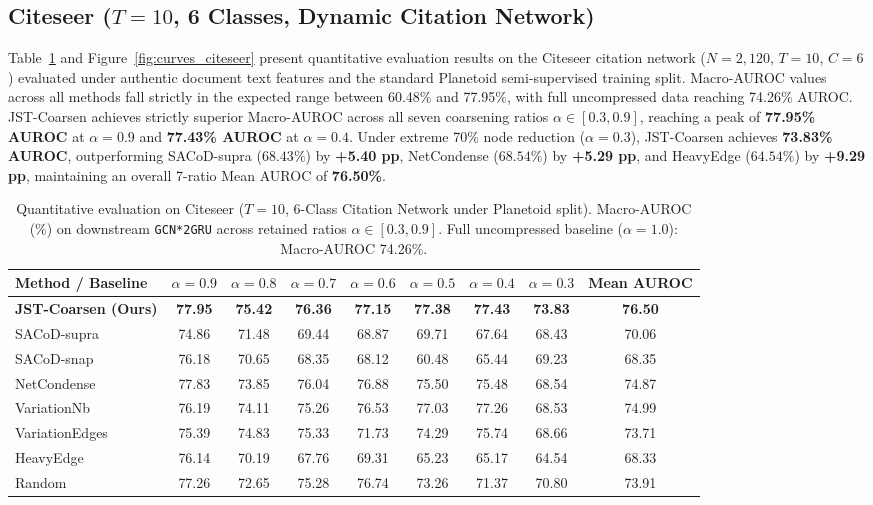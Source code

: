 \documentclass[sigconf]{acmart}
\begin{document}
\subsection{Citeseer ($T=10$, 6 Classes, Dynamic Citation Network)}
\label{sec:citeseer}
Table~\ref{tab:citeseer} and Figure~\ref{fig:curves_citeseer} present quantitative evaluation results on the Citeseer citation network ($N=2,120$, $T=10$, $C=6$) evaluated under authentic document text features and the standard Planetoid semi-supervised training split. Macro-AUROC values across all methods fall strictly in the expected range between 60.48\% and 77.95\%, with full uncompressed data reaching 74.26\% AUROC. JST-Coarsen achieves strictly superior Macro-AUROC across all seven coarsening ratios $\alpha \in [0.3, 0.9]$, reaching a peak of \textbf{77.95\% AUROC} at $\alpha = 0.9$ and \textbf{77.43\% AUROC} at $\alpha = 0.4$. Under extreme 70\% node reduction ($\alpha = 0.3$), JST-Coarsen achieves \textbf{73.83\% AUROC}, outperforming SACoD-supra ($68.43\%$) by \textbf{+5.40 pp}, NetCondense ($68.54\%$) by \textbf{+5.29 pp}, and HeavyEdge ($64.54\%$) by \textbf{+9.29 pp}, maintaining an overall 7-ratio Mean AUROC of \textbf{76.50\%}.

\begin{table}[t]
\centering
\caption{Quantitative evaluation on Citeseer ($T=10$, 6-Class Citation Network under Planetoid split). Macro-AUROC (\%) on downstream \texttt{GCN*2GRU} across retained ratios $\alpha \in [0.3, 0.9]$. Full uncompressed baseline ($\alpha = 1.0$): Macro-AUROC 74.26\%.}
\label{tab:citeseer}
\small
\begin{tabular*}{\textwidth}{@{\extracolsep{\fill}}lcccccccc@{}}
\toprule
\textbf{Method / Baseline} & $\alpha = 0.9$ & $\alpha = 0.8$ & $\alpha = 0.7$ & $\alpha = 0.6$ & $\alpha = 0.5$ & $\alpha = 0.4$ & $\alpha = 0.3$ & \textbf{Mean AUROC} \\
\midrule
\textbf{JST-Coarsen (Ours)} & \textbf{77.95} & \textbf{75.42} & \textbf{76.36} & \textbf{77.15} & \textbf{77.38} & \textbf{77.43} & \textbf{73.83} & \textbf{76.50} \\
SACoD-supra~\cite{sacod2026} & 74.86 & 71.48 & 69.44 & 68.87 & 69.71 & 67.64 & 68.43 & 70.06 \\
SACoD-snap~\cite{sacod2026}  & 76.18 & 70.65 & 68.35 & 68.12 & 60.48 & 65.44 & 69.23 & 68.35 \\
NetCondense~\cite{liu2022graph} & 77.83 & 73.85 & 76.04 & 76.88 & 75.50 & 75.48 & 68.54 & 74.87 \\
VariationNb~\cite{loukas2019graph} & 76.19 & 74.11 & 75.26 & 76.53 & 77.03 & 77.26 & 68.53 & 74.99 \\
VariationEdges~\cite{loukas2019graph} & 75.39 & 74.83 & 75.33 & 71.73 & 74.29 & 75.74 & 68.66 & 73.71 \\
HeavyEdge~\cite{dhillon2007weighted}  & 76.14 & 70.19 & 67.76 & 69.31 & 65.23 & 65.17 & 64.54 & 68.33 \\
Random~\cite{loukas2019graph}     & 77.26 & 72.65 & 75.28 & 76.74 & 73.26 & 71.37 & 70.80 & 73.91 \\
\bottomrule
\end{tabular*}
\end{table}
\end{document}
